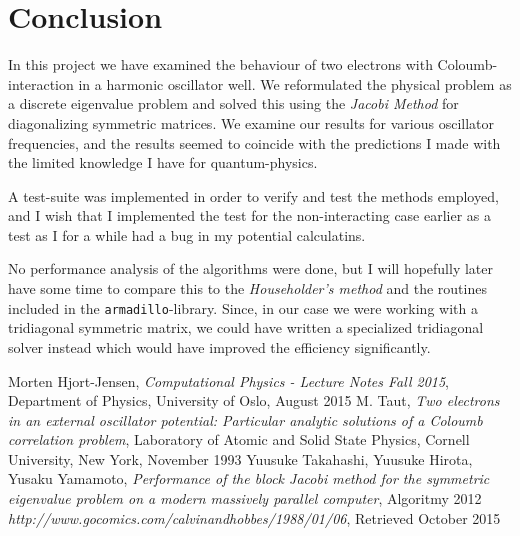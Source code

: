 \documentclass[a4paper, 10pt]{amsart}
\newcommand{\mline}[1]{\texttt{#1}}
\begin{document}
\clearpage
\section{Conclusion}

In this project we have examined the behaviour of two electrons with
Coloumb-interaction in a harmonic oscillator well. We reformulated the physical
problem as a discrete eigenvalue problem and solved this using the \emph{Jacobi
  Method} for diagonalizing symmetric matrices. We examine our results for
various oscillator frequencies, and the results seemed to coincide with the
predictions I made with the limited knowledge I have for quantum-physics.

A test-suite was implemented in order to verify and test the methods employed,
and I wish that I implemented the test for the non-interacting case earlier as a
test as I for a while had a bug in my potential calculatins.

No performance analysis of the algorithms were done, but I will hopefully later
have some time to compare this to the \emph{Householder's method} and the
routines included in the \mline{armadillo}-library. Since, in our case we were
working with a tridiagonal symmetric matrix, we could have written a specialized
tridiagonal solver instead which would have improved the efficiency
significantly.

\begin{thebibliography}{9}
    Morten Hjort-Jensen,
    \emph{Computational Physics - Lecture Notes Fall 2015},
    Department of Physics, University of Oslo,
    August 2015
  M. Taut, \emph{Two electrons in an external oscillator potential: Particular
  analytic solutions of a Coloumb correlation problem}, Laboratory of Atomic
  and Solid State Physics, Cornell University, New York, November 1993
    Yuusuke Takahashi, Yuusuke Hirota, Yusaku Yamamoto, \emph{Performance of
    the block Jacobi method for the symmetric eigenvalue problem on a modern
  massively parallel computer}, Algoritmy 2012
    \emph{http://www.gocomics.com/calvinandhobbes/1988/01/06}, Retrieved
    October 2015
\end{thebibliography}
\end{document}
